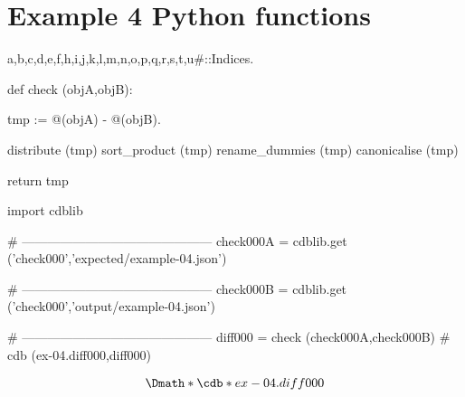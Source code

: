 \documentclass[12pt]{cdblatex}
\begin{document}
\section*{Example 4 Python functions}


\begin{cadabra}
   {a,b,c,d,e,f,h,i,j,k,l,m,n,o,p,q,r,s,t,u#}::Indices.

   def check (objA,objB):

       tmp := @(objA) - @(objB).

       distribute     (tmp)
       sort_product   (tmp)
       rename_dummies (tmp)
       canonicalise   (tmp)

       return tmp

   import cdblib

   # ---------------------------------------------
   check000A = cdblib.get ('check000','expected/example-04.json')

   # ---------------------------------------------
   check000B = cdblib.get ('check000','output/example-04.json')

   # ---------------------------------------------
   diff000 = check (check000A,check000B)   # cdb (ex-04.diff000,diff000)

\end{cadabra}


\begin{dgroup*}
   \Dmath*{\cdb*{ex-04.diff000}}
\end{dgroup*}
\end{document}
